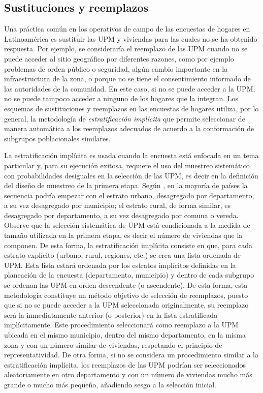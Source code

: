 \documentclass[
  10pt,
  spanish,
]{book}
\begin{document}
\hypertarget{sustituciones-y-reemplazos}{%
\subsection{Sustituciones y reemplazos}\label{sustituciones-y-reemplazos}}

Una práctica común en los operativos de campo de las encuestas de hogares en Latinoamérica es sustituir las UPM y viviendas para las cuales no se ha obtenido respuesta. Por ejemplo, se consideraría el reemplazo de las UPM cuando no se puede acceder al sitio geográfico por diferentes razones, como por ejemplo problemas de orden público o seguridad, algún cambio importante en la infraestructura de la zona, o porque no se tiene el consentimiento informado de las autoridades de la comunidad. En este caso, si no se puede acceder a la UPM, no se puede tampoco acceder a ninguno de los hogares que la integran. Los esquemas de sustituciones y reemplazos en las encuestas de hogares utiliza, por lo general, la metodología de \emph{estratificación implícita} que permite seleccionar de manera automática a los reemplazos adecuados de acuerdo a la conformación de subgrupos poblacionales similares.

La estratificación implícita es usada cuando la encuesta está enfocada en un tema particular y, para su ejecución exitosa, requiere el uso del muestreo sistemático con probabilidades desiguales en la selección de las UPM, es decir en la definición del diseño de muestreo de la primera etapa. Según \citet[pág. 46]{United_Nations_2008}, en la mayoría de países la secuencia podría empezar con el estrato urbano, desagregado por departamento, a su vez desagregado por municipio; el estrato rural, de forma similar, es desagregado por departamento, a su vez desagregado por comuna o vereda. Observe que la selección sistemática de UPM está condicionada a la medida de tamaño utilizada en la primera etapa, es decir el número de viviendas que la componen. De esta forma, la estratificación implícita consiste en que, para cada estrato explícito (urbano, rural, regiones, etc.) se crea una lista ordenada de UPM. Esta lista estará ordenada por los estratos implícitos definidas en la planeación de la encuesta (departamento, municipio) y dentro de cada subgrupo se ordenan las UPM en orden descendente (o ascendente). De esta forma, esta metodología constituye un método objetivo de selección de reemplazos, puesto que si no se puede acceder a la UPM seleccionada originalmente, su reemplazo será la inmediatamente anterior (o posterior) en la lista estratificada implícitamente. Este procedimiento seleccionará como reemplazo a la UPM ubicada en el mismo municipio, dentro del mismo departamento, en la misma zona y con un número similar de viviendas, respetando el principio de representatividad. De otra forma, si no se considera un procedimiento similar a la estratificación implícita, los reemplazos de las UPM podrían ser seleccionados aleatoriamente en otro departamento y con un número de viviendas mucho más grande o mucho más pequeño, añadiendo sesgo a la selección inicial.
\end{document}
